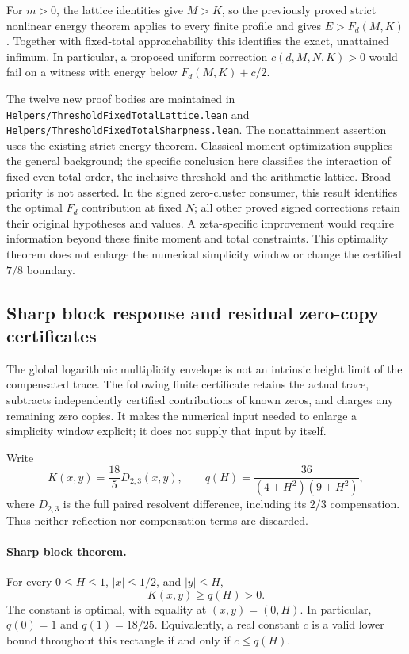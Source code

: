 For \(m>0\), the lattice identities give \(M>K\), so the previously
proved strict nonlinear energy theorem applies to every finite profile and
gives \(E>F_d(M,K)\).  Together with fixed-total approachability this
identifies the exact, unattained infimum.  In particular, a proposed uniform
correction \(c(d,M,N,K)>0\) would fail on a witness with energy below
\(F_d(M,K)+c/2\).

The twelve new proof bodies are maintained in
\texttt{Helpers/ThresholdFixedTotalLattice.lean} and
\texttt{Helpers/ThresholdFixedTotalSharpness.lean}.
The nonattainment assertion uses the existing strict-energy theorem.
Classical moment optimization supplies the general background; the specific
conclusion here classifies the interaction of fixed even total order, the
inclusive threshold and the arithmetic lattice.  Broad priority is not
asserted.  In the signed zero-cluster consumer, this result identifies the
optimal \(F_d\) contribution at fixed \(N\); all other proved signed
corrections retain their original hypotheses and values.  A zeta-specific
improvement would require information beyond these finite moment and total
constraints.  This optimality theorem does not enlarge the numerical
simplicity window or change the certified \(7/8\) boundary.

\subsection{Sharp block response and residual zero-copy certificates}
\label{sec:residual-block}

The global logarithmic multiplicity envelope is not an intrinsic height
limit of the compensated trace.  The following finite certificate retains
the actual trace, subtracts independently certified contributions of known
zeros, and charges any remaining zero copies.  It makes the numerical
input needed to enlarge a simplicity window explicit; it does not supply
that input by itself.

Write
\[
 K(x,y)=\frac{18}{5}D_{2,3}(x,y),\qquad
 q(H)=\frac{36}{(4+H^2)(9+H^2)},
\]
where \(D_{2,3}\) is the full paired resolvent difference, including its
\(2/3\) compensation.  Thus neither reflection nor compensation terms
are discarded.

\paragraph{Sharp block theorem.}
For every \(0\le H\le1\), \(|x|\le1/2\), and \(|y|\le H\),
\begin{equation}
 K(x,y)\ge q(H)>0.
 \label{eq:sharp-block-charge}
\end{equation}
The constant is optimal, with equality at \((x,y)=(0,H)\).  In particular,
\(q(0)=1\) and \(q(1)=18/25\).  Equivalently, a real constant \(c\)
is a valid lower bound throughout this rectangle if and only if
\(c\le q(H)\).

